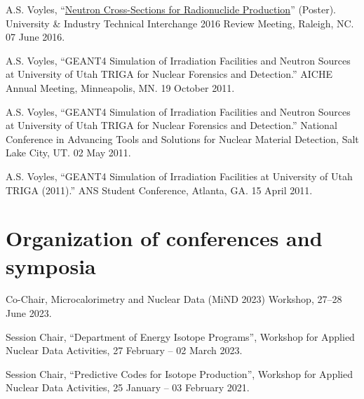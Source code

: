 \begin{bibsection}
\item A.S. Voyles, \enquote{\href{https://github.com/avoyles/posters/blob/master/2016-06-07-UITI/Voyles_UITI2016_Poster_OsloUpdate.pdf}{Neutron Cross-Sections for Radionuclide Production}} (Poster).  University \& Industry Technical Interchange 2016 Review Meeting, Raleigh, NC. 07 June 2016.

\item A.S. Voyles, \enquote{GEANT4 Simulation of Irradiation Facilities and Neutron Sources at University of Utah TRIGA for
Nuclear Forensics and Detection.}  AICHE Annual Meeting, Minneapolis, MN. 19 October 2011.

\item A.S. Voyles, \enquote{GEANT4 Simulation of Irradiation Facilities and Neutron Sources at University of Utah TRIGA for
Nuclear Forensics and Detection.}   National Conference in Advancing Tools and Solutions for
Nuclear Material Detection, Salt Lake City, UT. 02 May 2011.

\item A.S. Voyles, \enquote{GEANT4 Simulation of Irradiation Facilities at University of Utah TRIGA (2011).} 
ANS Student Conference, Atlanta, GA. 15 April 2011.

\end{bibsection}


\section{\sc Organization of conferences and symposia}

\begin{list2}

\item Co-Chair,  Microcalorimetry and Nuclear Data (MiND 2023) Workshop,  27--28 June 2023.

\item Session Chair, \enquote{Department of Energy Isotope Programs}, Workshop for Applied Nuclear Data Activities,  27 February -- 02 March 2023.

\item Session Chair, \enquote{Predictive Codes for Isotope Production}, Workshop for Applied Nuclear Data Activities,  25 January -- 03 February 2021.

\end{list2}
